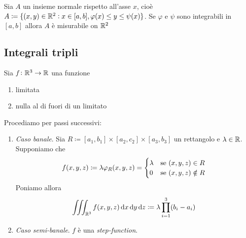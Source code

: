 \begin{prop}
	Sia $ A $ un insieme normale rispetto all'asse $ x $, cioè $ A \coloneqq \{(x, y) \in \mathbb{R}^2 : x \in [a, b], \varphi(x) \leq y \leq \psi(x)\} $. Se $ \varphi $ e $ \psi $ sono integrabili in $ [a, b] $ allora $ A $ è misurabile on $ \mathbb{R}^2 $
\end{prop}



\subsection{Integrali tripli}

\begin{definition}
	Sia $ f \colon \mathbb{R}^3 \to \mathbb{R} $ una funzione
	\begin{enumerate}[label = (\roman*)]
		\item limitata
		\item nulla al di fuori di un limitato 
	\end{enumerate}
	Procediamo per passi successivi:
	\begin{enumerate}
		\item \emph{Caso banale}. Sia $ R \coloneqq [a_1, b_1] \times [a_2, c_2] \times [a_3, b_3] $ un rettangolo e $ \lambda \in \mathbb{R} $. Supponiamo che 
		\begin{equation*}
			f(x, y, z) \coloneqq \lambda \varphi_{R}(x, y, z) = 
			\begin{cases}
			\lambda & \text{se $ (x, y, z) \in R $} \\
			0 & \text{se $ (x, y, z) \notin R $}
			\end{cases}
		\end{equation*}
		Poniamo allora 
		\begin{equation}
			\iiint_{\R^3} f(x, y, z) \dif{x} \dif{y} \dif{z} \coloneqq \lambda \prod_{i = 1}^{3} (b_i - a_i)
		\end{equation}
		
		\item \emph{Caso semi-banale}. $ f $ è una \emph{step-function}.
		

\end{enumerate}
\end{definition}
